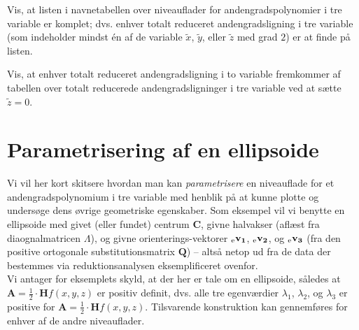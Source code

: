 \begin{exercise} \label{exercKomplet}
Vis, at listen i navnetabellen over niveauflader for andengradspolynomier i tre variable er komplet; dvs.  enhver totalt reduceret andengradsligning i tre variable (som indeholder mindst \'{e}n af de variable $\widetilde{x}$, $\widetilde{y}$, eller $\widetilde{z}$ med grad $2$) er at finde på listen.
\end{exercise}

\begin{exercise} \label{exercExtract2D}
Vis, at enhver totalt reduceret andengradsligning i to variable fremkommer af tabellen over totalt reducerede andengradsligninger i tre variable ved at sætte $\widetilde{z}=0$.
\end{exercise}



\section{Parametrisering af en ellipsoide}\label{secEllipsoideParam}

Vi vil her kort skitsere hvordan man kan \emph{parametrisere} en niveauflade for et andengrads\-polynomium i tre variable med henblik på at kunne plotte og undersøge dens øvrige geometriske egenskaber. Som eksempel vil vi benytte en ellipsoide
med givet (eller fundet) centrum $\mathbf{C}$, givne halvakser (aflæst fra diaognalmatricen  $\Lambda$), og givne orienterings-vektorer ${_\mathrm{e}\mathbf{\mathbf{v}_{1}}}$, ${_\mathrm{e}\mathbf{\mathbf{v}_{2}}}$, og  ${_\mathrm{e}\mathbf{\mathbf{v}_{3}}}$ (fra den positive ortogonale substitutionsmatrix $\mathbf{Q}$) -- altså net\-op ud fra de data der bestemmes via reduktionsanalysen eksemplificeret ovenfor.\\

 Vi antager for eksemplets skyld, at der her er tale om en ellipsoide, således at $\mathbf{A} = \frac{1}{2}\cdot \mathbf{H}f(x,y, z)$ er positiv definit, dvs. alle tre egenværdier $\lambda_{1}$, $\lambda_{2}$, og $\lambda_{3}$ er positive for $\mathbf{A} = \frac{1}{2}\cdot \mathbf{H}f(x,y, z)$. Tilsvarende konstruktion kan gennemføres for enhver af  de andre niveauflader.\\

